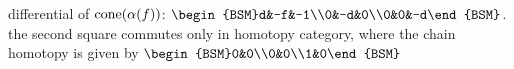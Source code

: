 differential of $\operatorname{cone}(\alpha(f))$: $\begin{BSM}d&-f&-1\\0&-d&0\\0&0&-d\end{BSM}$. the second square commutes only in homotopy category, where the chain homotopy is given by $\begin{BSM}0&0\\0&0\\1&0\end{BSM}$
